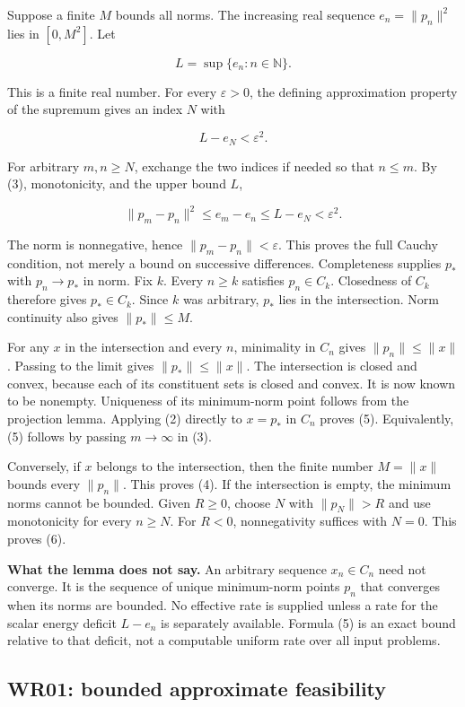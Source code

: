 \documentclass[11pt]{article}
\begin{document}
Suppose a finite \(M\) bounds all norms. The increasing real sequence
\(e_n = \|p_n\|^2\) lies in \([0,M^2]\). Let

\[
L=\sup\{e_n:n\in\mathbb N\}.
\]

This is a finite real number. For every \(\varepsilon > 0\), the
defining approximation property of the supremum gives an index \(N\)
with

\[
L-e_N<\varepsilon^2.
\]

For arbitrary \(m,n \ge N\), exchange the two indices if needed so that
\(n \le m\). By (3), monotonicity, and the upper bound \(L\),

\[
\|p_m-p_n\|^2\le e_m-e_n\le L-e_N<\varepsilon^2.
\]

The norm is nonnegative, hence \(\|p_m-p_n\| < \varepsilon\). This
proves the full Cauchy condition, not merely a bound on successive
differences. Completeness supplies \(p_*\) with \(p_n \to p_*\) in norm.
Fix \(k\). Every \(n \ge k\) satisfies \(p_n \in C_k\). Closedness of
\(C_k\) therefore gives \(p_* \in C_k\). Since \(k\) was arbitrary,
\(p_*\) lies in the intersection. Norm continuity also gives
\(\|p_*\| \le M\).

For any \(x\) in the intersection and every \(n\), minimality in \(C_n\)
gives \(\|p_n\| \le \|x\|\). Passing to the limit gives
\(\|p_*\| \le \|x\|\). The intersection is closed and convex, because
each of its constituent sets is closed and convex. It is now known to be
nonempty. Uniqueness of its minimum-norm point follows from the
projection lemma. Applying (2) directly to \(x = p_*\) in \(C_n\) proves
(5). Equivalently, (5) follows by passing \(m \to \infty\) in (3).

Conversely, if \(x\) belongs to the intersection, then the finite number
\(M = \|x\|\) bounds every \(\|p_n\|\). This proves (4). If the
intersection is empty, the minimum norms cannot be bounded. Given
\(R \ge 0\), choose \(N\) with \(\|p_N\| > R\) and use monotonicity for
every \(n \ge N\). For \(R < 0\), nonnegativity suffices with \(N = 0\).
This proves (6).

\textbf{What the lemma does not say.} An arbitrary sequence
\(x_n \in C_n\) need not converge. It is the sequence of unique
minimum-norm points \(p_n\) that converges when its norms are bounded.
No effective rate is supplied unless a rate for the scalar energy
deficit \(L-e_n\) is separately available. Formula (5) is an exact bound
relative to that deficit, not a computable uniform rate over all input
problems.

\hypertarget{wr01-bounded-approximate-feasibility}{%
\subsection{WR01: bounded approximate
feasibility}\label{wr01-bounded-approximate-feasibility}}
\end{document}
